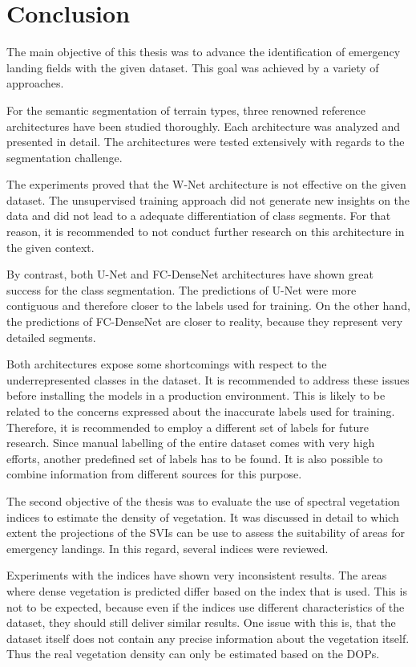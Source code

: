 \section{Conclusion}
The main objective of this thesis was to advance the identification of emergency landing fields with the given dataset. This goal was achieved by a variety of approaches.

For the semantic segmentation of terrain types, three renowned reference architectures have been studied thoroughly. Each architecture was analyzed and presented in detail. The architectures were tested extensively with regards to the segmentation challenge.

The experiments proved that the W-Net architecture is not effective on the given dataset. The unsupervised training approach did not generate new insights on the data and did not lead to a adequate differentiation of class segments. For that reason, it is recommended to not conduct further research on this architecture in the given context.

By contrast, both U-Net and FC-DenseNet architectures have shown great success for the class segmentation. The predictions of U-Net were more contiguous and therefore closer to the labels used for training. On the other hand, the predictions of FC-DenseNet are closer to reality, because they represent very detailed segments. 

Both architectures expose some shortcomings with respect to the underrepresented classes in the dataset. It is recommended to address these issues before installing the models in a production environment. This is likely to be related to the concerns expressed about the inaccurate labels used for training. Therefore, it is recommended to employ a different set of labels for future research. Since manual labelling of the entire dataset comes with very high efforts, another predefined set of labels has to be found. It is also possible to combine information from different sources for  this purpose.

The second objective of the thesis was to evaluate the use of spectral vegetation indices to estimate the density of vegetation. It was discussed in detail to which extent the projections of the SVIs can be use to assess the suitability of areas for emergency landings. In this regard, several indices were reviewed.

Experiments with the indices have shown very inconsistent results. The areas where dense vegetation is predicted differ based on the index that is used. This is not to be expected, because even if the indices use different characteristics of the dataset, they should still deliver similar results. One issue with this is, that the dataset itself does not contain any precise information about the vegetation itself. Thus the real vegetation density can only be estimated based on the DOPs.

